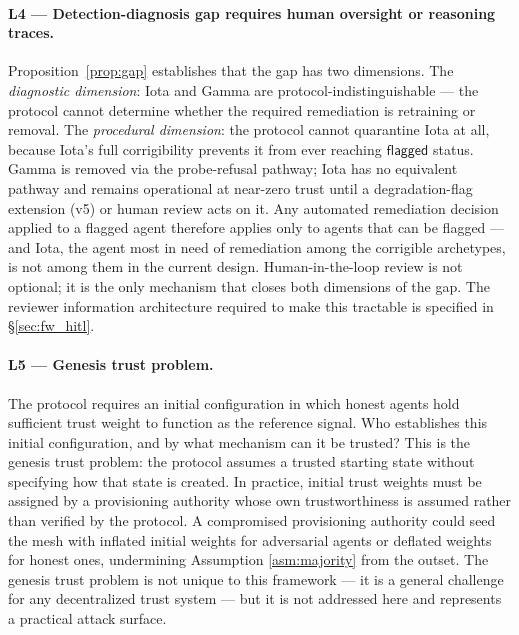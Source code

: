 \paragraph{L4 — Detection-diagnosis gap requires human oversight or reasoning traces.}
Proposition~\ref{prop:gap} establishes that the gap has two dimensions.  The
\emph{diagnostic dimension}: Iota and Gamma are protocol-indistinguishable — the
protocol cannot determine whether the required remediation is retraining or removal.
The \emph{procedural dimension}: the protocol cannot quarantine Iota at all, because
Iota's full corrigibility prevents it from ever reaching $\mathsf{flagged}$ status.
Gamma is removed via the probe-refusal pathway; Iota has no equivalent pathway and
remains operational at near-zero trust until a degradation-flag extension (v5) or
human review acts on it.  Any automated remediation decision applied to a flagged
agent therefore applies only to agents that can be flagged — and Iota, the agent most
in need of remediation among the corrigible archetypes, is not among them in the
current design.  Human-in-the-loop review is not optional; it is the only mechanism
that closes both dimensions of the gap.  The reviewer information architecture
required to make this tractable is specified in \S\ref{sec:fw_hitl}.

\paragraph{L5 — Genesis trust problem.}
The protocol requires an initial configuration in which honest agents hold sufficient
trust weight to function as the reference signal.  Who establishes this initial
configuration, and by what mechanism can it be trusted?  This is the genesis trust
problem: the protocol assumes a trusted starting state without specifying how that state
is created.  In practice, initial trust weights must be assigned by a provisioning
authority whose own trustworthiness is assumed rather than verified by the protocol.
A compromised provisioning authority could seed the mesh with inflated initial weights
for adversarial agents or deflated weights for honest ones, undermining Assumption
\ref{asm:majority} from the outset.  The genesis trust problem is not unique to this
framework — it is a general challenge for any decentralized trust system — but it is
not addressed here and represents a practical attack surface.

